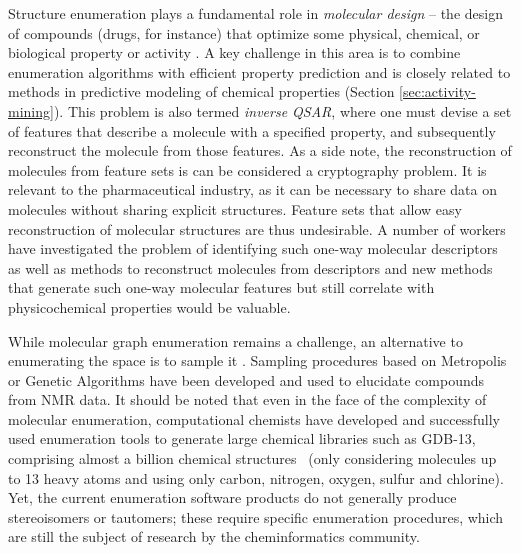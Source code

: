 \documentclass{../sig-alternate}
\begin{document}
Structure enumeration plays a fundamental role in \emph{molecular
  design} -- the design of compounds (drugs, for instance) that
optimize some physical, chemical, or biological property or activity
\cite{Schneider:2005uq}. A key challenge in this area is to combine
enumeration algorithms with efficient property prediction and is
closely related to methods in predictive modeling of chemical
properties (Section \ref{sec:activity-mining}). This problem is also
termed \emph{inverse QSAR}, where one must devise a set of features
that describe a molecule with a specified property, and subsequently
reconstruct the molecule from those features. As a side note, the
reconstruction of molecules from feature sets is can be considered a
cryptography problem. It is relevant to the pharmaceutical industry,
as it can be necessary to share data on molecules without sharing
explicit structures. Feature sets that allow easy reconstruction of
molecular structures are thus undesirable. A number of workers have
investigated the problem of identifying such one-way molecular
descriptors as well as methods to reconstruct molecules from
descriptors \cite{Masek:2008kx} and new methods that generate such
one-way molecular features but still correlate with physicochemical
properties would be valuable.

While molecular graph enumeration remains a challenge,
an alternative to enumerating the space is to sample it
\cite{goldberg1999}. Sampling procedures based on Metropolis or
Genetic Algorithms have been developed and used to elucidate
compounds from NMR data. It should be noted that even in the
face of the complexity of molecular enumeration,
computational chemists have developed and successfully used
enumeration tools to generate large chemical libraries such as GDB-13,
comprising almost a billion chemical structures~\cite{GDB} (only
considering molecules up to 13 heavy atoms and using only carbon,
nitrogen, oxygen, sulfur and chlorine). Yet, the current enumeration
software products do not generally produce stereoisomers or tautomers;
these require specific enumeration procedures, which are still the
subject of research by the cheminformatics community.
\end{document}
